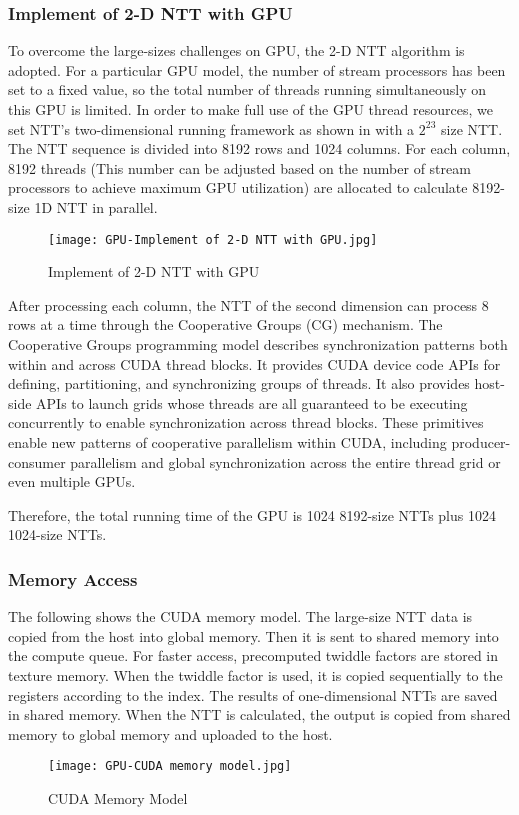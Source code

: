 \subsubsection{Implement of 2-D NTT with GPU}
To overcome the large-sizes challenges on GPU, the 2-D NTT algorithm is adopted. For a particular GPU model, the number of stream processors has been set to a fixed value, so the total number of threads running simultaneously on this GPU is limited. In order to make full use of the GPU thread resources, we set NTT's two-dimensional running framework as shown in  with a $2^{23}$ size NTT. The NTT sequence is divided into 8192 rows and 1024 columns. For each column, 8192 threads (This number can be adjusted based on the number of stream processors to achieve maximum GPU utilization) are allocated to calculate 8192-size 1D NTT in parallel.
\begin{figure}[!ht]
    \centering
    \texttt{[image: GPU-Implement of 2-D NTT with GPU.jpg]}
    \caption{Implement of 2-D NTT with GPU}
    \label{fig:Implement of 2-D NTT with GPU}
\end{figure}
After processing each column, the NTT of the second dimension can process 8 rows at a time through the Cooperative Groups (CG) mechanism. The Cooperative Groups programming model describes synchronization patterns both within and across CUDA thread blocks. It provides CUDA device code APIs for defining, partitioning, and synchronizing groups of threads. It also provides host-side APIs to launch grids whose threads are all guaranteed to be executing concurrently to enable synchronization across thread blocks. These primitives enable new patterns of cooperative parallelism within CUDA, including producer-consumer parallelism and global synchronization across the entire thread grid or even multiple GPUs.

Therefore, the total running time of the GPU is 1024 8192-size NTTs plus 1024 1024-size NTTs.
\subsubsection{Memory Access}
The following  shows the CUDA memory model. The large-size NTT data is copied from the host into global memory. Then it is sent to shared memory into the compute queue. For faster access, precomputed twiddle factors are stored in texture memory. When the twiddle factor is used, it is copied sequentially to the registers according to the index. The results of one-dimensional NTTs are saved in shared memory. When the NTT is calculated, the output is copied from shared memory to global memory and uploaded to the host.
\begin{figure}[!ht]
    \centering
    \texttt{[image: GPU-CUDA memory model.jpg]}
    \caption{CUDA Memory Model}
    \label{fig:CUDA Memory Model}
\end{figure}
